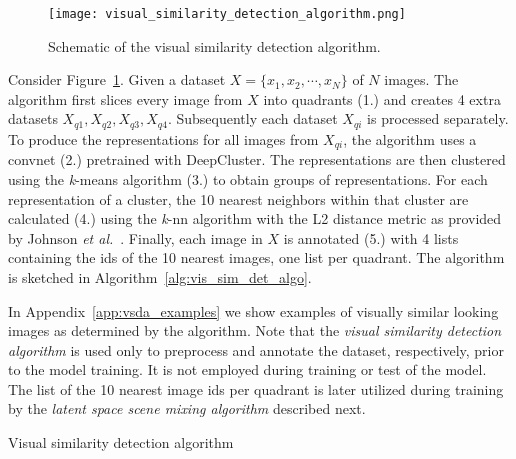 \documentclass[a4paper,12pt]{report}
\begin{document}
\begin{figure}[ht]
\centering
\texttt{[image: visual\_similarity\_detection\_algorithm.png]}
\caption{Schematic of the visual similarity detection algorithm.}
\label{fig:schematic_vsda}
\end{figure}
Consider Figure~\ref{fig:schematic_vsda}. Given a dataset $X = \{x_1,x_2,\cdots,x_N\}$ of $N$ images. The algorithm first slices every image from $X$ into quadrants (1.) and creates 4 extra datasets $X_{q1}, X_{q2}, X_{q3}, X_{q4}$. Subsequently each dataset $X_{qi}$ is processed separately. To produce the representations for all images from $X_{qi}$, the algorithm uses a convnet (2.) pretrained with DeepCluster. The representations are then clustered using the \textit{k}-means algorithm (3.) to obtain groups of representations. For each representation of a cluster, the 10 nearest neighbors within that cluster are calculated (4.) using the \textit{k}-nn algorithm with the L2 distance metric as provided by Johnson \textit{et al.}~\cite{FaissKnn}. Finally, each image in $X$ is annotated (5.) with 4 lists containing the ids of the 10 nearest images, one list per quadrant. The algorithm is sketched in Algorithm~\ref{alg:vis_sim_det_algo}.

In Appendix~\ref{app:vsda_examples} we show examples of visually similar looking images as determined by the algorithm. Note that the \textit{visual similarity detection algorithm} is used only to preprocess and annotate the dataset, respectively, prior to the model training. It is not employed during training or test of the model. The list of the 10 nearest image ids per quadrant is later utilized during training by the \textit{latent space scene mixing algorithm} described next.

\begin{algorithm}[H]
\DontPrintSemicolon
\LinesNumbered
{}
\caption{Visual similarity detection algorithm}\label{alg:vis_sim_det_algo}
\end{algorithm}
\end{document}
